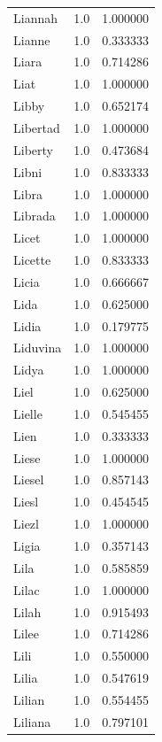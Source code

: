 \documentclass[
  letterpaper,
  DIV=11,
  numbers=noendperiod]{scrreprt}
\begin{document}
\begin{tabular}{lrr}
Liannah         &   1.0 &   1.000000 \\
Lianne          &   1.0 &   0.333333 \\
Liara           &   1.0 &   0.714286 \\
Liat            &   1.0 &   1.000000 \\
Libby           &   1.0 &   0.652174 \\
Libertad        &   1.0 &   1.000000 \\
Liberty         &   1.0 &   0.473684 \\
Libni           &   1.0 &   0.833333 \\
Libra           &   1.0 &   1.000000 \\
Librada         &   1.0 &   1.000000 \\
Licet           &   1.0 &   1.000000 \\
Licette         &   1.0 &   0.833333 \\
Licia           &   1.0 &   0.666667 \\
Lida            &   1.0 &   0.625000 \\
Lidia           &   1.0 &   0.179775 \\
Liduvina        &   1.0 &   1.000000 \\
Lidya           &   1.0 &   1.000000 \\
Liel            &   1.0 &   0.625000 \\
Lielle          &   1.0 &   0.545455 \\
Lien            &   1.0 &   0.333333 \\
Liese           &   1.0 &   1.000000 \\
Liesel          &   1.0 &   0.857143 \\
Liesl           &   1.0 &   0.454545 \\
Liezl           &   1.0 &   1.000000 \\
Ligia           &   1.0 &   0.357143 \\
Lila            &   1.0 &   0.585859 \\
Lilac           &   1.0 &   1.000000 \\
Lilah           &   1.0 &   0.915493 \\
Lilee           &   1.0 &   0.714286 \\
Lili            &   1.0 &   0.550000 \\
Lilia           &   1.0 &   0.547619 \\
Lilian          &   1.0 &   0.554455 \\
Liliana         &   1.0 &   0.797101 \\

\end{tabular}
\end{document}

